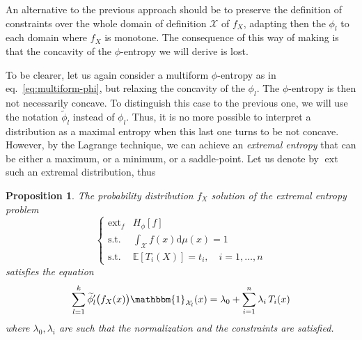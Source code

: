 \documentclass[english,onecolumn]{elsarticle}
\def\dmu{\mathrm{d}\mu}
\def\X{\mathcal{X}}
\def\un{\mathbbm{1}}
\def\ext{\operatorname{ext}}
\newcommand\Esp[1]{\mathbb{E}\left[ #1 \right]}
\newtheorem{proposition}{Proposition}
\begin{document}
An alternative to the previous approach  should be to preserve the definition of
constraints over the whole domain of  definition $\X$ of $f_X$, adapting then the
$\phi_l$ to each domain where $f_X$  is monotone. The consequence of this way of
making is that the concavity of the $\phi$-entropy we will derive is lost.

To  be  clearer,  let  us  again  consider  a  multiform  $\phi$-entropy  as  in
eq.~\eqref{eq:multiform-phi}, but  relaxing the concavity of  the $\phi_l$.  The
$\phi$-entropy is then not necessarily concave.  To distinguish this case to the
previous one, we will use the notation $\widetilde{\phi}_l$ instead of $\phi_l$.
%
Thus, it  is no more possible to  interpret a distribution as  a maximal entropy
when this last  one turns to be not concave. However,  by the Lagrange technique,
we can  achieve an {\em  extremal entropy}  that can be  either a maximum,  or a
minimum,  or  a  saddle-point.  Let   us  denote  by  $\ext$  such  an  extremal
distribution, thus
%
\begin{proposition}
  The probability distribution $f_X$ solution of the extremal entropy problem
%
  \begin{equation}
  \begin{cases}
  \ext_f & H_\phi[f]\\[5mm]
  \text{s.t. } & \displaystyle \int_\X f(x) \dmu(x) = 1\\[5mm]
  \text{s.t. } & \Esp{T_i(X)} = t_i,  \quad i = 1, \ldots, n
  \end{cases}
  \label{eq:ExtEntMulti}
  \end{equation}
  satisfies the equation
  \begin{equation}
  \sum_{l=1}^k \widetilde{\phi}_l' \big( f_X(x) \big) \un_{\X_l}(x) =
  \lambda_0 + \sum_{i=1}^n \lambda_i \, T_i(x)
  \label{eq:sol-phi-multi-notconcave}
  \end{equation}
%
  where  $\lambda_0,  \lambda_i$  are   such  that  the  normalization  and  the
  constraints are satisfied.
\end{proposition}
\end{document}
